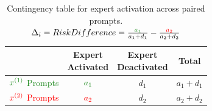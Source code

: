 \begin{table}[h]
\centering
\begin{tabular}{l|c|c|c}
\toprule
& \makecell{Expert\\Activated} & \makecell{Expert\\Deactivated} & Total \\
\midrule
$\textcolor{ForestGreen}{x^{(1)}}$ \textcolor{ForestGreen}{Prompts}  & $\textcolor{ForestGreen}{a_1}$  & $d_1$  & $a_1 + d_1$ \\
$\textcolor{red}{x^{(2)}}$ \textcolor{red}{Prompts}  & $\textcolor{red}{a_2}$  & $d_2$  & $a_2 + d_2$ \\
\bottomrule
\end{tabular}
\caption{Contingency table for expert activation across paired prompts. \\$\Delta_i = RiskDifference=\frac{\textcolor{ForestGreen}{a_1}}{a_1 + d_1} - \frac{\textcolor{red}{a_2}}{a_2 + d_2}$}
\label{tab:risk_difference}
\end{table}
